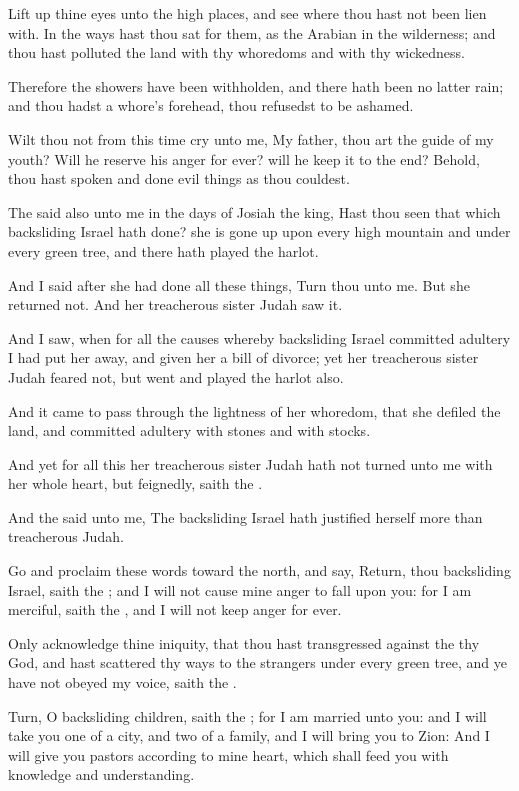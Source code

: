 \verse Lift up thine eyes unto the high places, and see where thou hast not been lien with. In the ways hast thou sat for them, as the Arabian in the wilderness; and thou hast polluted the land with thy whoredoms and with thy wickedness.

\verse Therefore the showers have been withholden, and there hath been no latter rain; and thou hadst a whore's forehead, thou refusedst to be ashamed.

\verse Wilt thou not from this time cry unto me, My father, thou art the guide of my youth?  \verse Will he reserve his anger for ever? will he keep it to the end?  Behold, thou hast spoken and done evil things as thou couldest.

\verse The \LORD said also unto me in the days of Josiah the king, Hast thou seen that which backsliding Israel hath done? she is gone up upon every high mountain and under every green tree, and there hath played the harlot.

\verse And I said after she had done all these things, Turn thou unto me.  But she returned not. And her treacherous sister Judah saw it.

\verse And I saw, when for all the causes whereby backsliding Israel committed adultery I had put her away, and given her a bill of divorce; yet her treacherous sister Judah feared not, but went and played the harlot also.

\verse And it came to pass through the lightness of her whoredom, that she defiled the land, and committed adultery with stones and with stocks.

\verse And yet for all this her treacherous sister Judah hath not turned unto me with her whole heart, but feignedly, saith the \LORD.

\verse And the \LORD said unto me, The backsliding Israel hath justified herself more than treacherous Judah.

\verse Go and proclaim these words toward the north, and say, Return, thou backsliding Israel, saith the \LORD; and I will not cause mine anger to fall upon you: for I am merciful, saith the \LORD, and I will not keep anger for ever.

\verse Only acknowledge thine iniquity, that thou hast transgressed against the \LORD thy God, and hast scattered thy ways to the strangers under every green tree, and ye have not obeyed my voice, saith the \LORD.

\verse Turn, O backsliding children, saith the \LORD; for I am married unto you: and I will take you one of a city, and two of a family, and I will bring you to Zion: \verse And I will give you pastors according to mine heart, which shall feed you with knowledge and understanding.

